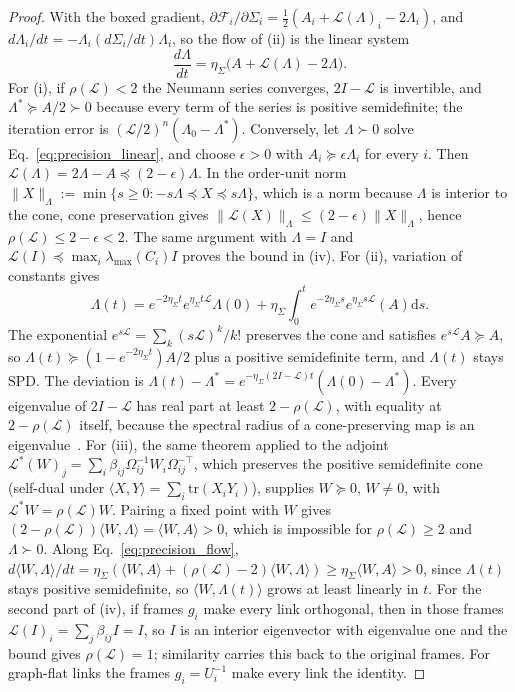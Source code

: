 \begin{proof}
With the boxed gradient, $\partial\mathcal{F}_i/\partial\Sigma_i = \tfrac{1}{2}(A_i + \mathcal{L}(\Lambda)_i - 2\Lambda_i)$, and $d\Lambda_i/dt = -\Lambda_i(d\Sigma_i/dt)\Lambda_i$, so the flow of (ii) is the linear system
\begin{equation}
\frac{d\Lambda}{dt} = \eta_\Sigma\big(A + \mathcal{L}(\Lambda) - 2\Lambda\big).
\label{eq:precision_flow}
\end{equation}
For (i), if $\rho(\mathcal{L}) < 2$ the Neumann series converges, $2I - \mathcal{L}$ is invertible, and $\Lambda^* \succeq A/2 \succ 0$ because every term of the series is positive semidefinite; the iteration error is $(\mathcal{L}/2)^n(\Lambda_0 - \Lambda^*)$. Conversely, let $\Lambda \succ 0$ solve Eq.~\eqref{eq:precision_linear}, and choose $\epsilon > 0$ with $A_i \succeq \epsilon\Lambda_i$ for every $i$. Then $\mathcal{L}(\Lambda) = 2\Lambda - A \preceq (2-\epsilon)\Lambda$. In the order-unit norm $\|X\|_\Lambda := \min\{s \geq 0 : -s\Lambda \preceq X \preceq s\Lambda\}$, which is a norm because $\Lambda$ is interior to the cone, cone preservation gives $\|\mathcal{L}(X)\|_\Lambda \leq (2-\epsilon)\|X\|_\Lambda$, hence $\rho(\mathcal{L}) \leq 2 - \epsilon < 2$. The same argument with $\Lambda = I$ and $\mathcal{L}(I) \preceq \max_i\lambda_{\max}(C_i) I$ proves the bound in (iv). For (ii), variation of constants gives
\[
\Lambda(t) = e^{-2\eta_\Sigma t}e^{\eta_\Sigma t\mathcal{L}}\Lambda(0) + \eta_\Sigma\int_0^t e^{-2\eta_\Sigma s}e^{\eta_\Sigma s\mathcal{L}}(A)\mathrm{d}s.
\]
The exponential $e^{s\mathcal{L}} = \sum_k (s\mathcal{L})^k/k!$ preserves the cone and satisfies $e^{s\mathcal{L}}A \succeq A$, so $\Lambda(t) \succeq (1 - e^{-2\eta_\Sigma t})A/2$ plus a positive semidefinite term, and $\Lambda(t)$ stays SPD. The deviation is $\Lambda(t) - \Lambda^* = e^{-\eta_\Sigma(2I - \mathcal{L})t}(\Lambda(0) - \Lambda^*)$. Every eigenvalue of $2I - \mathcal{L}$ has real part at least $2 - \rho(\mathcal{L})$, with equality at $2 - \rho(\mathcal{L})$ itself, because the spectral radius of a cone-preserving map is an eigenvalue~\cite{Vandergraft1968}. For (iii), the same theorem applied to the adjoint $\mathcal{L}^*(W)_j = \sum_i\beta_{ij}\Omega_{ij}^{-1}W_i\Omega_{ij}^{-\top}$, which preserves the positive semidefinite cone (self-dual under $\langle X, Y\rangle = \sum_i\mathrm{tr}(X_iY_i)$), supplies $W \succeq 0$, $W \neq 0$, with $\mathcal{L}^*W = \rho(\mathcal{L})W$. Pairing a fixed point with $W$ gives $(2 - \rho(\mathcal{L}))\langle W, \Lambda\rangle = \langle W, A\rangle > 0$, which is impossible for $\rho(\mathcal{L}) \geq 2$ and $\Lambda \succ 0$. Along Eq.~\eqref{eq:precision_flow}, $d\langle W, \Lambda\rangle/dt = \eta_\Sigma(\langle W, A\rangle + (\rho(\mathcal{L}) - 2)\langle W, \Lambda\rangle) \geq \eta_\Sigma\langle W, A\rangle > 0$, since $\Lambda(t)$ stays positive semidefinite, so $\langle W, \Lambda(t)\rangle$ grows at least linearly in $t$. For the second part of (iv), if frames $g_i$ make every link orthogonal, then in those frames $\mathcal{L}(I)_i = \sum_j\beta_{ij}I = I$, so $I$ is an interior eigenvector with eigenvalue one and the bound gives $\rho(\mathcal{L}) = 1$; similarity carries this back to the original frames. For graph-flat links the frames $g_i = U_i^{-1}$ make every link the identity.

\end{proof}

